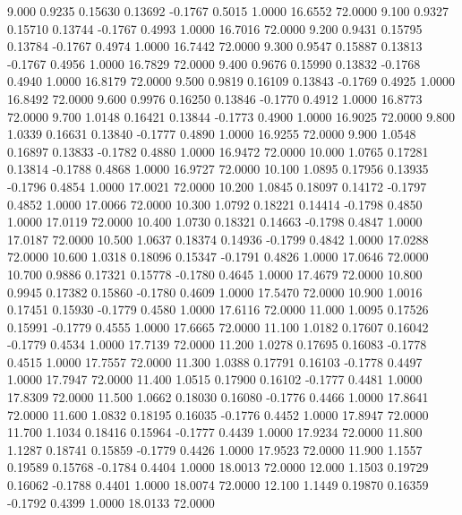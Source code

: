    9.000   0.9235   0.15630   0.13692  -0.1767   0.5015   1.0000  16.6552  72.0000
   9.100   0.9327   0.15710   0.13744  -0.1767   0.4993   1.0000  16.7016  72.0000
   9.200   0.9431   0.15795   0.13784  -0.1767   0.4974   1.0000  16.7442  72.0000
   9.300   0.9547   0.15887   0.13813  -0.1767   0.4956   1.0000  16.7829  72.0000
   9.400   0.9676   0.15990   0.13832  -0.1768   0.4940   1.0000  16.8179  72.0000
   9.500   0.9819   0.16109   0.13843  -0.1769   0.4925   1.0000  16.8492  72.0000
   9.600   0.9976   0.16250   0.13846  -0.1770   0.4912   1.0000  16.8773  72.0000
   9.700   1.0148   0.16421   0.13844  -0.1773   0.4900   1.0000  16.9025  72.0000
   9.800   1.0339   0.16631   0.13840  -0.1777   0.4890   1.0000  16.9255  72.0000
   9.900   1.0548   0.16897   0.13833  -0.1782   0.4880   1.0000  16.9472  72.0000
  10.000   1.0765   0.17281   0.13814  -0.1788   0.4868   1.0000  16.9727  72.0000
  10.100   1.0895   0.17956   0.13935  -0.1796   0.4854   1.0000  17.0021  72.0000
  10.200   1.0845   0.18097   0.14172  -0.1797   0.4852   1.0000  17.0066  72.0000
  10.300   1.0792   0.18221   0.14414  -0.1798   0.4850   1.0000  17.0119  72.0000
  10.400   1.0730   0.18321   0.14663  -0.1798   0.4847   1.0000  17.0187  72.0000
  10.500   1.0637   0.18374   0.14936  -0.1799   0.4842   1.0000  17.0288  72.0000
  10.600   1.0318   0.18096   0.15347  -0.1791   0.4826   1.0000  17.0646  72.0000
  10.700   0.9886   0.17321   0.15778  -0.1780   0.4645   1.0000  17.4679  72.0000
  10.800   0.9945   0.17382   0.15860  -0.1780   0.4609   1.0000  17.5470  72.0000
  10.900   1.0016   0.17451   0.15930  -0.1779   0.4580   1.0000  17.6116  72.0000
  11.000   1.0095   0.17526   0.15991  -0.1779   0.4555   1.0000  17.6665  72.0000
  11.100   1.0182   0.17607   0.16042  -0.1779   0.4534   1.0000  17.7139  72.0000
  11.200   1.0278   0.17695   0.16083  -0.1778   0.4515   1.0000  17.7557  72.0000
  11.300   1.0388   0.17791   0.16103  -0.1778   0.4497   1.0000  17.7947  72.0000
  11.400   1.0515   0.17900   0.16102  -0.1777   0.4481   1.0000  17.8309  72.0000
  11.500   1.0662   0.18030   0.16080  -0.1776   0.4466   1.0000  17.8641  72.0000
  11.600   1.0832   0.18195   0.16035  -0.1776   0.4452   1.0000  17.8947  72.0000
  11.700   1.1034   0.18416   0.15964  -0.1777   0.4439   1.0000  17.9234  72.0000
  11.800   1.1287   0.18741   0.15859  -0.1779   0.4426   1.0000  17.9523  72.0000
  11.900   1.1557   0.19589   0.15768  -0.1784   0.4404   1.0000  18.0013  72.0000
  12.000   1.1503   0.19729   0.16062  -0.1788   0.4401   1.0000  18.0074  72.0000
  12.100   1.1449   0.19870   0.16359  -0.1792   0.4399   1.0000  18.0133  72.0000
